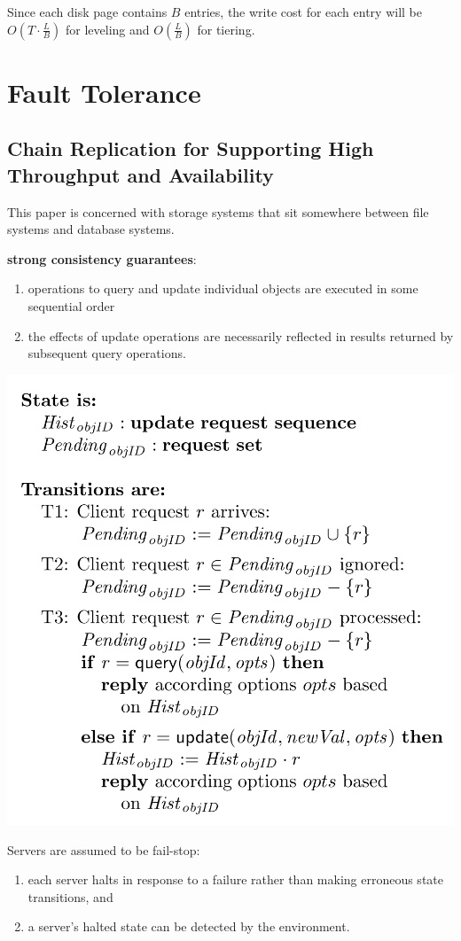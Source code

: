 \documentclass[11pt]{article}
\begin{document}
\begin{enumerate}
Since each disk page contains \(B\) entries, the write cost for each entry will be
\(O(T\cdot\frac{L}{B})\) for leveling and \(O(\frac{L}{B})\) for tiering.
\end{enumerate}
\section{Fault Tolerance}
\label{sec:orgd3fd548}
\subsection{Chain Replication for Supporting High Throughput and Availability}
\label{sec:org2959d5b}
This paper is concerned with storage systems that sit somewhere between file systems and database systems.

\textbf{strong consistency guarantees}:
\begin{enumerate}
\item operations to query and update individual objects are executed in some sequential order
\item the effects of update operations are necessarily reflected in results returned by subsequent query
operations.
\end{enumerate}


\begin{center}
\includegraphics[width=.8\textwidth]{../images/db/1.png}
\end{center}

Servers are assumed to be fail-stop:
\begin{enumerate}
\item each server halts in response to a failure rather than making erroneous state transitions, and
\item a server’s halted state can be detected by the environment.
\end{enumerate}
\end{document}
